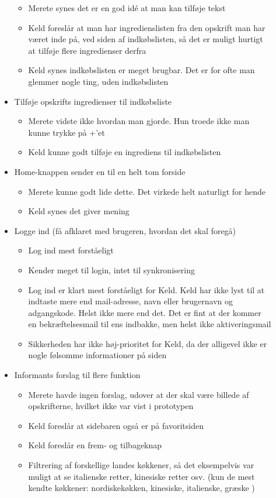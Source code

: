 \begin{description}
\begin{itemize}[noitemsep]
\begin{itemize}[noitemsep]
\item Merete synes det er en god idé at man kan tilføje tekst
\item Keld foreslår at man har ingredienslisten fra den opskrift man har været inde på, ved siden af indkøbslisten, så det er muligt hurtigt at tilføje flere ingredienser derfra
\item Keld synes indkøbslisten er meget brugbar. Det er for ofte man glemmer nogle ting, uden indkøbslisten
\end{itemize}
\item Tilføje opskrifts ingredienser til indkøbsliste
\begin{itemize}[noitemsep]
\item Merete vidste ikke hvordan man gjorde. Hun troede ikke man kunne trykke på +’et
\item Keld kunne godt tilføje en ingrediens til indkøbslisten
\end{itemize}
\item Home-knappen sender en til en helt tom forside
\begin{itemize}[noitemsep]
\item Merete kunne godt lide dette. Det virkede helt naturligt for hende
\item Keld synes det giver mening
\end{itemize}
\item Logge ind (få afklaret med brugeren, hvordan det skal foregå)
\begin{itemize}[noitemsep]
\item Log ind mest forståeligt
\item Kender meget til login, intet til synkronisering
\item Log ind er klart mest forståeligt for Keld. Keld har ikke lyst til at indtaste mere end mail-adresse, navn eller brugernavn og adgangskode. Helst ikke mere end det. Det er fint at der kommer en bekræftelsesmail til ens indbakke, men helst ikke aktiveringsmail
\item Sikkerheden har ikke høj-prioritet for Keld, da der alligevel ikke er nogle følsomme informationer på siden
\end{itemize}
\item Informants forslag til flere funktion
\begin{itemize}[noitemsep]
\item Merete havde ingen forslag, udover at der skal være billede af opskrifterne, hvilket ikke var vist i prototypen
\item Keld foreslår at sidebaren også er på favoritsiden
\item Keld foreslår en frem- og tilbageknap
\item Filtrering af forskellige landes køkkener, så det eksempelvis var muligt at se italienske retter, kinesiske retter osv. (kun de mest kendte køkkener: nordiskekøkken, kinesiske, italienske, græske \fx)
\end{itemize}
\end{itemize}
\end{description}


